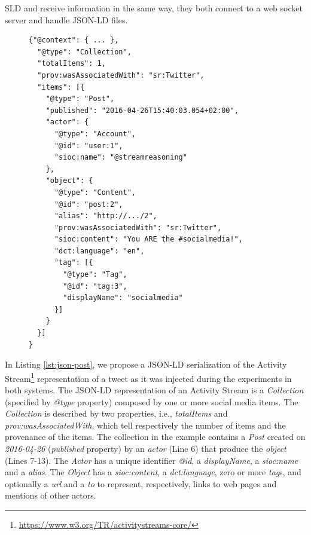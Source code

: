 {SLD and \sti{} receive information in the same way, they both connect to a web socket server and handle JSON-LD files. 

\begin{figure}[ht]
\begin{minipage}{0.95\linewidth}
\begin{lstlisting}[caption={JSON representation of a Twitter micro-post. Due to the lack of space we omitted the context declaration that contains the namespace.},label=lst:json-post, style=JSON]
{"@context": { ... }, 
  "@type": "Collection",
  "totalItems": 1,
  "prov:wasAssociatedWith": "sr:Twitter",
  "items": [{
    "@type": "Post",
    "published": "2016-04-26T15:40:03.054+02:00",
    "actor": {
      "@type": "Account",
      "@id": "user:1",
      "sioc:name": "@streamreasoning"
    },
    "object": {
      "@type": "Content",
      "@id": "post:2",
      "alias": "http://.../2",
      "prov:wasAssociatedWith": "sr:Twitter",
      "sioc:content": "You ARE the #socialmedia!",
      "dct:language": "en",
      "tag": [{
        "@type": "Tag",
        "@id": "tag:3",
        "displayName": "socialmedia"
      }]
    }
  }]
}
\end{lstlisting}
\end{minipage}
\end{figure}

In Listing \ref{lst:json-post}, we propose a JSON-LD serialization of the Activity Stream\footnote{\url{https://www.w3.org/TR/activitystreams-core/}} representation of a tweet as it was injected during the experiments in both systems.  
The JSON-LD representation of an Activity Stream is a \textit{Collection} (specified by \textit{@type} property) composed by one or more social media items. The \textit{Collection} is described by two properties, i.e., \textit{totalItems} and \textit{prov:wasAssociatedWith}, which tell respectively the number of items and the provenance of the items. The collection in the example contains a \textit{Post} created on \textit{2016-04-26} (\textit{published} property) by  an \textit{actor} (Line 6) that produce the \textit{object} (Lines 7-13). 
The \textit{Actor} has a unique identifier  \textit{@id}, a \textit{displayName}, a \textit{sioc:name} and a \textit{alias}. The \textit{Object} has a \textit{sioc:content}, a \textit{dct:language}, zero or more \textit{tag}s, and optionally a \textit{url} and a \textit{to} to represent, respectively, links to web pages and mentions of other actors.

}
